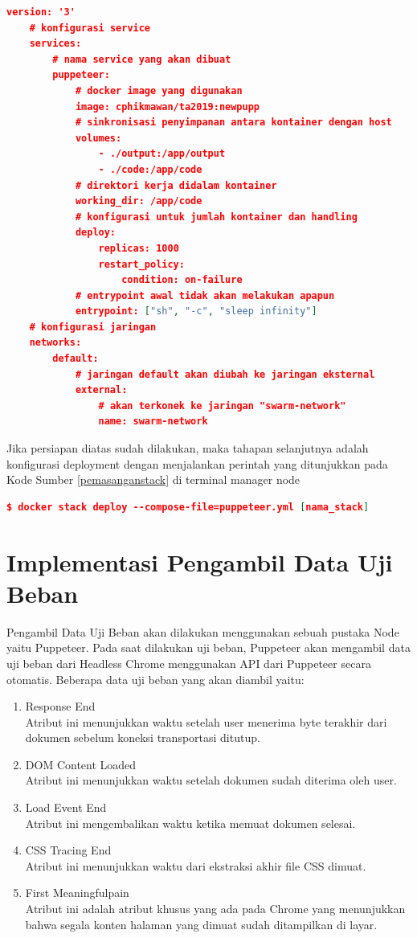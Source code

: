 			\begin{lstlisting}[frame=single,tabsize=2,breaklines,caption={Konfigurasi puppeteer.yml},label=puppyaml, captionpos=b, language=json]
	version: '3'
	# konfigurasi service
	services:
		# nama service yang akan dibuat
		puppeteer:
			# docker image yang digunakan
			image: cphikmawan/ta2019:newpupp
			# sinkronisasi penyimpanan antara kontainer dengan host
			volumes:
				- ./output:/app/output
				- ./code:/app/code
			# direktori kerja didalam kontainer
			working_dir: /app/code
			# konfigurasi untuk jumlah kontainer dan handling
			deploy:
				replicas: 1000
				restart_policy:
					condition: on-failure
			# entrypoint awal tidak akan melakukan apapun
			entrypoint: ["sh", "-c", "sleep infinity"]
	# konfigurasi jaringan
	networks:
		default:
			# jaringan default akan diubah ke jaringan eksternal
			external:
				# akan terkonek ke jaringan "swarm-network"
				name: swarm-network
			\end{lstlisting}
			
			\indent Jika persiapan diatas sudah dilakukan, maka tahapan selanjutnya adalah konfigurasi deployment dengan menjalankan perintah yang ditunjukkan pada Kode Sumber \ref{pemasanganstack} di terminal manager node
			\begin{lstlisting}[frame=single,tabsize=2,breaklines,caption={Perintah untuk pemasangan kontainer },label=pemasanganstack, captionpos=b, language=json,numbers=none]
	$ docker stack deploy --compose-file=puppeteer.yml [nama_stack]
			\end{lstlisting}
	
	\section{Implementasi Pengambil Data Uji Beban}
		Pengambil Data Uji Beban akan dilakukan menggunakan sebuah pustaka Node yaitu Puppeteer. Pada saat dilakukan uji beban, Puppeteer akan mengambil data uji beban dari Headless Chrome menggunakan API dari Puppeteer secara otomatis. Beberapa data uji beban yang akan diambil yaitu:
		\begin{enumerate}
			\item Response End \\
				Atribut ini menunjukkan waktu setelah user menerima byte terakhir dari dokumen sebelum koneksi transportasi ditutup.
			\item DOM Content Loaded \\
				Atribut ini menunjukkan waktu setelah dokumen sudah diterima oleh user.
			\item Load Event End \\
				Atribut ini mengembalikan waktu ketika memuat dokumen selesai.
			\item CSS Tracing End \\
				Atribut ini menunjukkan waktu dari ekstraksi akhir file CSS dimuat.
			\item First Meaningfulpain \\
				Atribut ini adalah atribut khusus yang ada pada Chrome yang menunjukkan bahwa segala konten halaman yang dimuat sudah ditampilkan di layar. \\
		\end{enumerate}
	 
